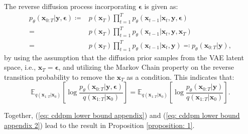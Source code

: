The reverse diffusion process incorporating $\boldsymbol{\epsilon}$ is given as:
\begin{equation}
\begin{aligned}
    p_\theta(\mathbf{x}_{0:T}|\mathbf{y},\boldsymbol{\epsilon})\coloneq & p(\mathbf{x}_T)\prod_{t=1}^Tp_\theta(\mathbf{x}_{t-1}|\mathbf{x}_t,\mathbf{y},\boldsymbol{\epsilon}) \\
    =&p(\mathbf{x}_T)\prod_{t=1}^Tp_\theta(\mathbf{x}_{t-1}|\mathbf{x}_t,\mathbf{y},\mathbf{x}_T) \\
    =&p(\mathbf{x}_T)\prod_{t=1}^Tp_\theta(\mathbf{x}_{t-1}|\mathbf{x}_t,\mathbf{y})\eqcolon p_\theta(\mathbf{x}_{0:T}|\mathbf{y}),
\end{aligned}
\end{equation}
by using the assumption that the diffusion prior samples from the VAE latent space, i.e., $\mathbf{x}_T=\boldsymbol{\epsilon}$, and utilizing the Markov Chain property on the reverse transition probability to remove the $\mathbf{x}_T$ as a condition. This indicates that:
\begin{equation}
    \mathbb{E}_{q(\mathbf{x}_{1:T}|\mathbf{x}_0)}\left[\log\frac{p_\theta({\mathbf{x}_{0:T}}|\mathbf{y},\boldsymbol{\epsilon})}{q(\mathbf{x}_{1:T}|\mathbf{x}_0)}\right]=\mathbb{E}_{q(\mathbf{x}_{1:T}|\mathbf{x}_0)}\left[\log\frac{p_\theta({\mathbf{x}_{0:T}}|\mathbf{y})}{q(\mathbf{x}_{1:T}|\mathbf{x}_0)}\right].
\label{eq: cddpm lower bound appendix 2} 
\end{equation}

Together, (\ref{eq: cddpm lower bound appendix}) and (\ref{eq: cddpm lower bound appendix 2}) lead to the result in Proposition \ref{proposition: 1}.



